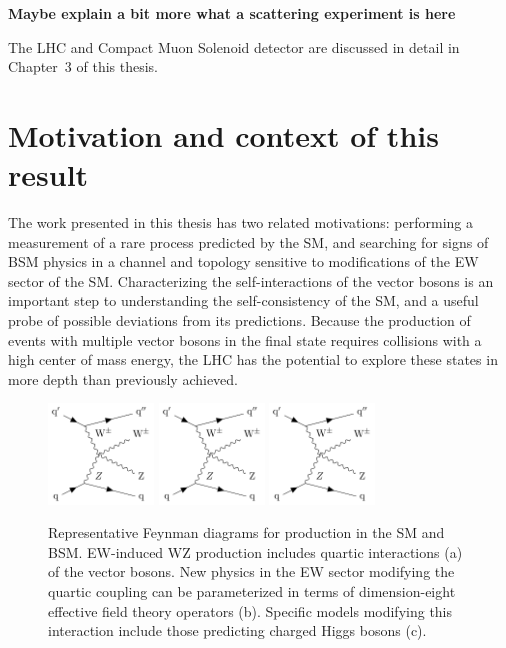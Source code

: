 \textbf{Maybe explain a bit more what a scattering experiment is here}

The LHC and Compact Muon Solenoid detector are discussed in detail 
in Chapter~3 of this thesis.

\section{Motivation and context of this result}
The work presented in this thesis
has two related motivations: performing a measurement of a rare
process predicted by the SM, and searching for signs of 
BSM physics in a channel and topology sensitive to modifications of
the EW sector of the SM.
Characterizing the self-interactions of the vector bosons is an important
step to understanding the self-consistency of the SM, and a useful probe
of possible deviations from its predictions. Because the production of events
with multiple vector bosons in the final state
requires collisions with a high center of mass energy, the LHC has
the potential to explore these states in more depth 
than previously achieved.

\begin{figure}[htbp]
  \centering
   \includegraphics[page=1,width=0.25\textwidth]{figures/FeynmanDiagrams/feynmanVBS.pdf}
   \includegraphics[page=2,width=0.25\textwidth]{figures/FeynmanDiagrams/feynmanVBS.pdf}
   \includegraphics[page=3,width=0.25\textwidth]{figures/FeynmanDiagrams/feynmanVBS.pdf}
  \caption{Representative Feynman diagrams for \WZjj production in the SM and BSM. 
  EW-induced WZ production includes quartic interactions (a) of the vector bosons.
  New physics in the EW sector modifying the quartic coupling 
  can be parameterized in terms of dimension-eight effective field theory operators (b).
  Specific models modifying this interaction include those predicting charged Higgs bosons (c).
  }
 \label{fig:feynmanDiagrams}
\end{figure}

